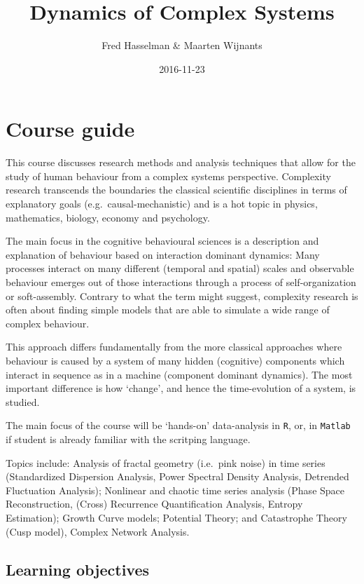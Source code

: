 \documentclass[]{book}
\title{Dynamics of Complex Systems}
\author{Fred Hasselman \& Maarten Wijnants}
\date{2016-11-23}
\let\stdsection\section
\renewcommand\section{\newpage\stdsection}
\begin{document}
\maketitle

{
\setcounter{tocdepth}{1}
\tableofcontents
}
\chapter{\texorpdfstring{\textbf{Course
guide}}{Course guide}}\label{course-guide}

This course discusses research methods and analysis techniques that
allow for the study of human behaviour from a complex systems
perspective. Complexity research transcends the boundaries the classical
scientific disciplines in terms of explanatory goals
(e.g.~causal-mechanistic) and is a hot topic in physics, mathematics,
biology, economy and psychology.

The main focus in the cognitive behavioural sciences is a description
and explanation of behaviour based on interaction dominant dynamics:
Many processes interact on many different (temporal and spatial) scales
and observable behaviour emerges out of those interactions through a
process of self-organization or soft-assembly. Contrary to what the term
might suggest, complexity research is often about finding simple models
that are able to simulate a wide range of complex behaviour.

This approach differs fundamentally from the more classical approaches
where behaviour is caused by a system of many hidden (cognitive)
components which interact in sequence as in a machine (component
dominant dynamics). The most important difference is how `change', and
hence the time-evolution of a system, is studied.

The main focus of the course will be `hands-on' data-analysis in
\texttt{R}, or, in \texttt{Matlab} if student is already familiar with
the scritping language.

Topics include: Analysis of fractal geometry (i.e.~pink noise) in time
series (Standardized Dispersion Analysis, Power Spectral Density
Analysis, Detrended Fluctuation Analysis); Nonlinear and chaotic time
series analysis (Phase Space Reconstruction, (Cross) Recurrence
Quantification Analysis, Entropy Estimation); Growth Curve models;
Potential Theory; and Catastrophe Theory (Cusp model), Complex Network
Analysis.

\section{Learning objectives}\label{learning-objectives}
\end{document}

